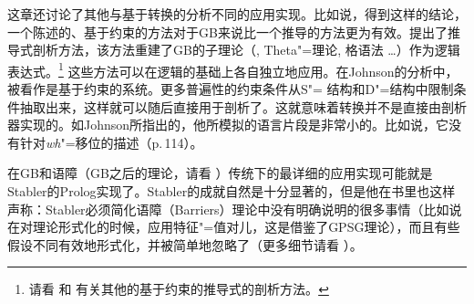 这章还讨论了其他与基于转换的分析不同的应用实现。比如说，\citet[, Section~4]{KT91a}得到这样的结论，一个陈述的、基于约束的方法对于GB来说比一个推导的方法更为有效。\citet{Johnson89a}提出了推导式剖析方法，该方法重建了GB的子理论（\xbart,
Theta"=理论, 格语法 \ldots）作为逻辑表达式。\footnote{
请看 和 有关其他的基于约束的推导式的剖析方法。
}
这些方法可以在逻辑的基础上各自独立地应用。在Johnson的分析中，\gbt 被看作是基于约束的系统。更多普遍性的约束条件从S"= 结构和D"=结构中限制条件抽取出来，这样就可以随后直接用于剖析了。这就意味着转换并不是直接由剖析器实现的。如Johnson所指出的，他所模拟的语言片段是非常小的。比如说，它没有针对\emph{wh}"=移位的描述（p.\,114）。

在GB和语障（GB之后的理论，请看 \citealp{Chomsky86b}）传统下的最详细的应用实现可能就是Stabler的Prolog实现了\citeyearpar{Stabler92a-u}。Stabler的成就自然是十分显著的，但是他在书里也这样声称：Stabler必须简化语障（Barriers）理论中没有明确说明的很多事情（比如说在对\xbar 理论形式化的时候，应用特征"=值对儿，这是借鉴了GPSG理论\indexgpsg），而且有些假设不同有效地形式化，并被简单地忽略了（更多细节请看\citealp{Briscoe97a} ）。

